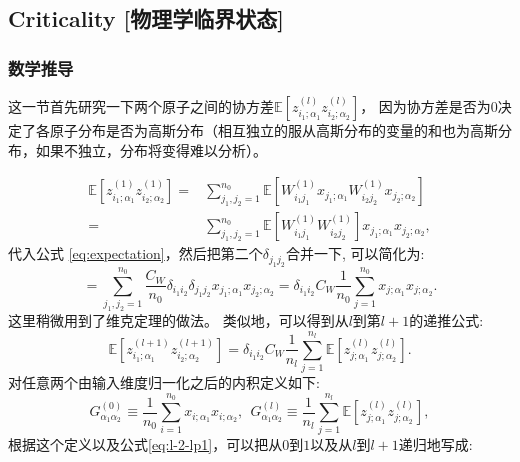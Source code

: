 \subsection{Criticality [物理学临界状态]}
\label{sec:3-2}

\subsubsection{数学推导}
这一节首先研究一下两个原子之间的协方差$\mathbb{E}[z_{i_1;\alpha_1}^{(l)}z_{i_2;\alpha_2}^{(l)}]$，
因为协方差是否为$0$决定了各原子分布是否为高斯分布（相互独立的服从高斯分布的变量的和也为高斯分布，如果不独立，分布将变得难以分析）。

\begin{equation*}
    \begin{aligned}
   \mathbb{E} [z_{i_1;\alpha_1}^{(1)}z_{i_2;\alpha_2}^{(1)}] =& \sum_{j_1,j_2=1}^{n_0} 
            \mathbb{E} [W_{i_1j_1}^{(1)}x_{j_1;\alpha_1}W_{i_2j_2}^{(1)}x_{j_2;\alpha_2}] \\
    =& \sum_{j_1,j_2=1}^{n_0} \mathbb{E} [W_{i_1j_1}^{(1)}W_{i_2j_2}^{(1)}]x_{j_1;\alpha_1}x_{j_2;\alpha_2},
    \end{aligned}
\end{equation*}
代入公式 \ref{eq:expectation}，然后把第二个$\delta_{j_1j_2}$合并一下, 可以简化为:
\begin{equation*}
             = \sum_{j_1,j_2=1}^{n_0} \frac{C_W}{n_0} 
             \delta_{i_1i_2}\delta_{j_1j_2}x_{j_1;\alpha_1}x_{j_2;\alpha_2}
             = \delta_{i_1i_2}C_W \frac{1}{n_0}\sum_{j=1}^{n_0}x_{j;\alpha_1}x_{j;\alpha_2}.
\end{equation*}
这里稍微用到了维克定理的做法。
类似地，可以得到从$l$到第$l+1$的递推公式:
\begin{equation}
    \mathbb{E}[z_{i_1;\alpha_1}^{(l+1)} z_{i_2;\alpha_2}^{(l+1)}] = 
        \delta_{i_1i_2}C_W \frac{1}{n_l}\sum_{j=1}^{n_l}\mathbb{E} 
            [z_{j;\alpha_1}^{(l)}z_{j;\alpha_2}^{(l)}].
    \label{eq:l-2-lp1}
\end{equation}
对任意两个由输入维度归一化之后的内积定义如下:
\begin{equation*}
    G_{\alpha_1\alpha_2}^{(0)} \equiv \frac{1}{n_0} \sum_{i=1}^{n_0} x_{i;\alpha_1}x_{i;\alpha_2}, ~~
    G_{\alpha_1\alpha_2}^{(l)} \equiv \frac{1}{n_l} \sum_{j=1}^{n_l} 
        \mathbb{E}[z_{j;\alpha_1}^{(l)}z_{j;\alpha_2}^{(l)}],
    \label{eq:2corr-def}
\end{equation*}
根据这个定义以及公式\ref{eq:l-2-lp1}，可以把从$0$到$1$以及从$l$到$l+1$递归地写成:
